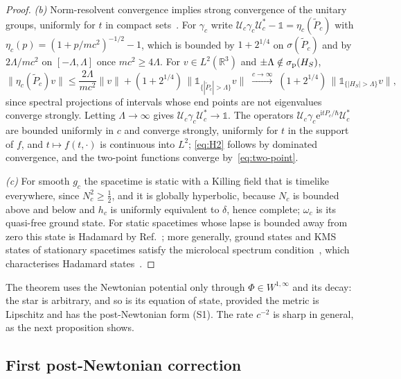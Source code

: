 \documentclass[%
 aip,
 jmp,
 amsmath,amssymb,
 reprint, onecolumn
]{revtex4-1}
\theoremstyle{definition}
\theoremstyle{remark}
\newcommand{\R}{\mathbb{R}}
\newcommand{\one}{\mathds{1}}
\newcommand{\rmi}{\mathrm{i}}
\newcommand{\rme}{\mathrm{e}}
\begin{document}
\begin{proof}
\emph{(b)} Norm-resolvent convergence implies strong convergence of the
unitary groups, uniformly for $t$ in compact sets~\cite{ReedSimon1972}.
For $\gamma_c$ write $\mathcal{U}_c\gamma_c\mathcal{U}_c^*-\one=
\eta_c(\tilde P_c)$ with $\eta_c(p)=(1+p/mc^2)^{-1/2}-1$, which is
bounded by $1+2^{1/4}$ on $\sigma(\tilde P_c)$ and by $2\Lambda/mc^2$ on
$[-\Lambda,\Lambda]$ once $mc^2\geq4\Lambda$. For $v\in L^2(\R^3)$ and
$\pm\Lambda\notin\sigma_{\rm p}(H_S)$,
\[
\|\eta_c(\tilde P_c)v\|\leq\frac{2\Lambda}{mc^2}\|v\|+(1+2^{1/4})\,
\|\one_{\{|\tilde P_c|>\Lambda\}}v\|
\;\xrightarrow{c\to\infty}\;(1+2^{1/4})\,\|\one_{\{|H_S|>\Lambda\}}v\|,
\]
since spectral projections of intervals whose end points are not
eigenvalues converge strongly. Letting $\Lambda\to\infty$ gives
$\mathcal{U}_c\gamma_c\mathcal{U}_c^*\to\one$. The operators
$\mathcal{U}_c\gamma_c\rme^{\rmi tP_c/\hbar}\mathcal{U}_c^*$ are bounded
uniformly in $c$ and converge strongly, uniformly for $t$ in the support
of $f$, and $t\mapsto f(t,\cdot)$ is continuous into $L^2$;
\eqref{eq:H2} follows by dominated convergence, and the two-point
functions converge by~\eqref{eq:two-point}.

\emph{(c)} For smooth $g_c$ the spacetime is static with a Killing
field that is timelike everywhere, since $N_c^2\geq\frac12$, and it is
globally hyperbolic, because $N_c$ is bounded above and below and $h_c$
is uniformly equivalent to $\delta$, hence complete; $\omega_c$ is its
quasi-free ground state. For static spacetimes whose lapse is bounded
away from zero this state is Hadamard by
Ref.~; more generally, ground states
and KMS states of stationary spacetimes satisfy the microlocal spectrum
condition~\cite{SahlmannVerch2000}, which characterises Hadamard
states~\cite{Radzikowski1996}.
\end{proof}

The theorem uses the Newtonian potential only through
$\Phi\in W^{1,\infty}$ and its decay: the star is arbitrary, and so is its
equation of state, provided the metric is Lipschitz and has the
post-Newtonian form (S1). The rate $c^{-2}$ is sharp in general, as the
next proposition shows.

\subsection{First post-Newtonian correction}
\end{document}
